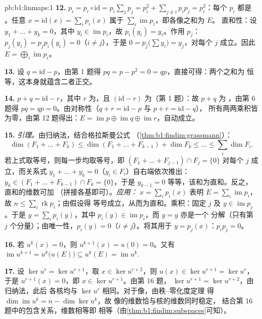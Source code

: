 \begin{solution}{pb:b1:linmaps:1}
\textbf{12.} $p_i = p_i \circ \mathrm{id} = p_i\sum_j p_j =
p_i^2 + \sum_{j \neq i} p_i p_j = p_i^2$：每个 $p_i$ 都是
。任意 $x = \mathrm{id}(x) = \sum_i p_i(x)$ 属于
$\sum_i \operatorname{im} p_i$，即各像之和为 $E$。
直和性：设 $y_1 + \dots + y_k = 0$，其中 $y_i \in
\operatorname{im} p_i$，故 $p_i(y_i) = y_i$。作用 $p_j$：$p_j
(y_i) = p_j p_i (y_i) = 0$（$i \neq j$），于是 $0 = p_j\bigl(\sum
y_i\bigr) = y_j$，对每个 $j$ 成立。因此 $E = \bigoplus_i
\operatorname{im} p_i$。

\textbf{13.} 设 $q = \mathrm{id} - p$，由第 1 题得 $pq =
p - p^2 = 0 = qp$，直接可得：两个之和为
恒等，这本身就蕴含二者正交。

\textbf{14.} $p + q = \mathrm{id} - r$，其中 $r$ 为，且
$(\mathrm{id} - r)$ 为（第 1 题）：故 $p + q$ 为
，由第 6 题得 $pq = qp = 0$。由对称性（$q +
r = \mathrm{id} - p$ 与 $p + r = \mathrm{id} - q$），
所有两两乘积皆为零，由第 12 题得出：$E =
\operatorname{im} p \oplus \operatorname{im} q \oplus
\operatorname{im} r$，自动成立。

\textbf{15.} \emph{引理。}由归纳法，结合格拉斯曼公式
（\cref{thm:b1:findim:grassmann}）：
\[
\dim(F_1 + \dots + F_k) \leq \dim(F_1 + \dots + F_{k-1}) + \dim
F_k \leq \dots \leq \sum_i \dim F_i .
\]
若上式取等号，则每一步均取等号，即 $(F_1 + \dots +
F_{j-1}) \cap F_j = \{0\}$ 对每个 $j$ 成立，而关系式 $y_1 +
\dots + y_k = 0$（$y_i \in F_i$）自右端依次推出：$y_k
\in (F_1 + \dots + F_{k-1}) \cap F_k = \{0\}$，于是 $y_{k-1} =
0$ 等等，该和为直和。反之，直和的维数可加
（拼接各基即可）。\emph{应用：}
$x = \sum_i p_i(x)$ 表明 $E = \sum_i \operatorname{im} p_i$，
故 $n \leq \sum_i \operatorname{rk} p_i$；由假设得
等号成立，从而为直和。乘积：固定 $j$ 及 $y \in
\operatorname{im} p_j$。于是 $y = \sum_i p_i(y)$，其中 $p_i(y)
\in \operatorname{im} p_i$，而 $y = y$ 亦是一个
分解（只有第 $j$ 个分量）；由唯一性，$p_i(y)
= 0$（$i \neq j$）。将其用于 $y = p_j(x)$：$p_i p_j = 0$。

\textbf{16.} 若 $u^k(x) = 0$，则 $u^{k+1}(x) = u(0) = 0$。又有
$\operatorname{im} u^{k+1} = u^k\bigl(u(E)\bigr) \subseteq
u^k(E) = \operatorname{im} u^k$.

\textbf{17.} 设 $\ker u^{r} = \ker u^{r+1}$，取 $x \in
\ker u^{r+2}$，则 $u(x) \in \ker u^{r+1} = \ker u^{r}$，于是
$u^{r+1}(x) = 0$，即 $x \in \ker u^{r+1}$。由第 16 题，
$\ker u^{r+1} = \ker u^{r+2}$，由归纳法，此后
各核均与 $\ker u^{r}$ 相同。对于像，由秩--零化度定理
得 $\dim\operatorname{im} u^k = n - \dim\ker u^k$，故
像的维数恰与核的维数同时稳定，
结合第 16 题中的包含关系，维数相等即
相等（由\cref{thm:b1:findim:subspaces}可知）。


\end{solution}
